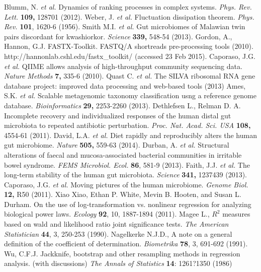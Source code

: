 \documentclass[12pt,oneside,letterpaper]{article}
\begin{document}
\newpage
\begin{thebibliography}{99}
	 Blumm, N. \textit{et al.} Dynamics of ranking processes in complex systems. {\it Phys. Rev. Lett.} {\bf 109,} 128701 (2012).
	 Weber, J. \textit{et al.} Fluctuation dissipation theorem. {\it Phys. Rev.} {\bf 101}, 1620-6 (1956).
	 Smith M.I.  \textit{et al.} Gut microbiomes of Malawian twin pairs discordant for kwashiorkor. {\it Science} {\bf 339,} 548-54 (2013).
	 Gordon, A., Hannon, G.J. FASTX-Toolkit. FASTQ/A shortreads pre-processing tools (2010). http://hannonlab.cshl.edu/fastx\_toolkit/ (accessed 23 Feb 2015).
	 Caporaso, J.G. \textit{et al.} QIIME allows analysis of high-throughput community sequencing data. {\it Nature Methods} {\bf 7,} 335-6 (2010).
	 Quast C.  \textit{et al.} The SILVA ribosomal RNA gene database project: improved data processing and web-based tools (2013)
	 Ames, S.K.  \textit{et al.} Scalable metagenomic taxonomy classification usng a reference genome database. {\it Bioinformatics} {\bf 29,} 2253-2260 (2013).
	 Dethlefsen L., Relman D. A. Incomplete recovery and individualized responses of the human distal gut microbiota to repeated antibiotic perturbation. {\it Proc. Nat. Acad. Sci. USA} {\bf 108,} 4554-61 (2011).
	 David, L.A. \textit{et al.} Diet rapidly and reproducibly alters the human gut microbiome. {\it Nature} {\bf 505,} 559-63 (2014).
	 Durban, A. \textit{et al.} Structural alterations of faecal and mucosa-associated bacterial communities in irritable bowel syndrome. {\it FEMS Microbiol. Ecol.} {\bf 86}, 581-9 (2013).
	 Faith, J.J.  \textit{et al.} The long-term stability of the human gut microbiota. {\it Science} {\bf 341,} 1237439 (2013).
	 Caporaso, J.G.  \textit{et al.} Moving pictures of the human microbiome. {\it Genome Biol.} {\bf 12,} R50 (2011).
 	 Xiao Xiao, Ethan P. White, Mevin B. Hooten, and Susan L. Durham. On the use of log-transformation vs. nonlinear regression for analyzing biological power laws. {\it Ecology} {\bf 92}, 10, 1887-1894 (2011).
 	 Magee L., $R^2$ measures based on wald and likelihood ratio joint significance tests. {\it The American Statistician} {\bf 44}, 3, 250-253 (1990).
	 Nagelkerke N.J.D., A note on a general definition of the coefficient of determination. {\it Biometrika} {\bf 78}, 3, 691-692 (1991).
	 Wu, C.F.J. Jackknife, bootstrap and other resampling methods in regression analysis. (with discussions) \textit{The Annals of Statistics} {\bf 14}: 1261?1350 (1986)
\end{thebibliography}
\end{document}
